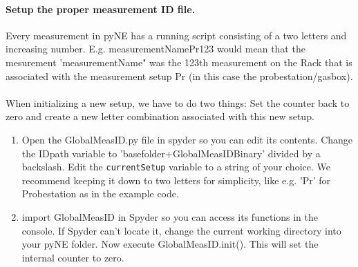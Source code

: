 \paragraph*{Setup the proper measurement ID file.}

Every measurement in pyNE has a running script consisting of a two letters and increasing number. E.g. measurementNamePr123 would mean that the mesurement 'measurementName" was the 123th measurement on the Rack that is associated with the measurement setup Pr (in this case the probestation/gasbox).\\
\\
When initializing a new setup, we have to do two things: Set the counter back to zero and create a new letter combination associated with this new setup.
\begin{enumerate}
\item Open the GlobalMeasID.py file in spyder so you can edit its contents. Change the IDpath variable to 'basefolder+GlobalMeasIDBinary' divided by a backslash. Edit the \texttt{currentSetup} variable to a string of your choice. We recommend keeping it down to two letters for simplicity, like e.g. 'Pr' for Probestation as in the example code.
\item import GlobalMeasID in Spyder so you can access its functions in the console. If Spyder can't locate it, change the current working directory into your pyNE folder. Now execute GlobalMeasID.init(). This will set the internal counter to zero.
\end{enumerate}